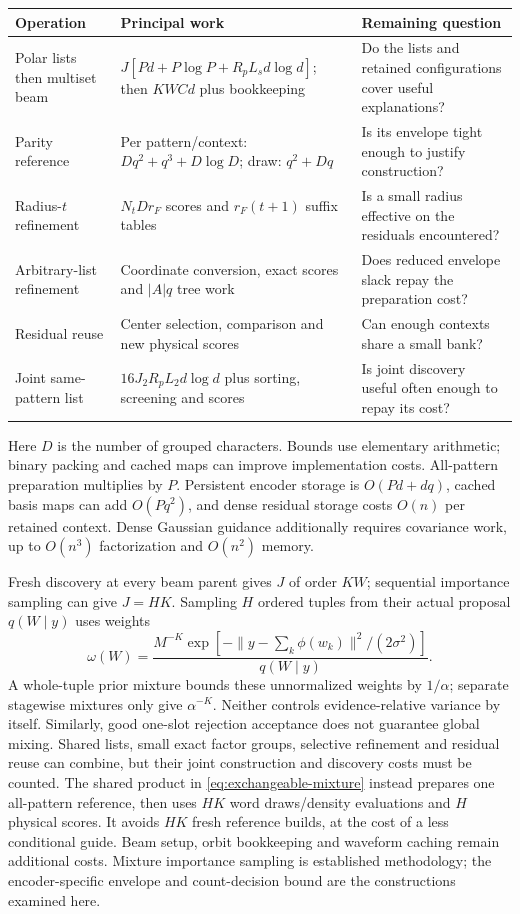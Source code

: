 \documentclass[10pt,a4paper]{article}
\begin{document}
\begin{center}\small
\begin{tabularx}{\textwidth}{@{}>{\raggedright\arraybackslash}p{}YY@{}}\toprule
Operation & Principal work & Remaining question\\\midrule
Polar lists then multiset beam & $J[Pd+P\log P+R_pL_sd\log d]$; then $KWCd$ plus bookkeeping & Do the lists and retained configurations cover useful explanations?\\
Parity reference & Per pattern/context: $Dq^2+q^3+D\log D$; draw: $q^2+Dq$ & Is its envelope tight enough to justify construction?\\
Radius-$t$ refinement & $N_tDr_F$ scores and $r_F(t+1)$ suffix tables & Is a small radius effective on the residuals encountered?\\
Arbitrary-list refinement & Coordinate conversion, exact scores and $|A|q$ tree work & Does reduced envelope slack repay the preparation cost?\\
Residual reuse & Center selection, comparison and new physical scores & Can enough contexts share a small bank?\\
Joint same-pattern list & $16J_2R_pL_2d\log d$ plus sorting, screening and scores & Is joint discovery useful often enough to repay its cost?\\\bottomrule
\end{tabularx}
\end{center}

Here $D$ is the number of grouped characters. Bounds use elementary arithmetic; binary packing and cached
maps can improve implementation costs. All-pattern preparation multiplies by $P$. Persistent encoder storage
is $O(Pd+dq)$, cached basis maps can add $O(Pq^2)$, and dense residual storage costs $O(n)$ per retained context.
Dense Gaussian guidance additionally requires covariance work, up to $O(n^3)$ factorization and $O(n^2)$ memory.

Fresh discovery at every beam parent gives $J$ of order $KW$; sequential importance sampling can give $J=HK$.
Sampling $H$ ordered tuples from their actual proposal $q(W\mid y)$ uses weights
\[
 \omega(W)=\frac{M^{-K}\exp[-\|y-\sum_k\phi(w_k)\|^2/(2\sigma^2)]}{q(W\mid y)}.
\]
A whole-tuple prior mixture bounds these unnormalized weights by $1/\alpha$; separate stagewise mixtures
only give $\alpha^{-K}$. Neither controls evidence-relative variance by itself. Similarly, good one-slot
rejection acceptance does not guarantee global mixing. Shared lists, small exact factor groups, selective
refinement and residual reuse can combine, but their joint construction and discovery costs must be counted.
The shared product in \eqref{eq:exchangeable-mixture} instead prepares one all-pattern reference,
then uses $HK$ word draws/density evaluations and $H$ physical scores. It avoids $HK$ fresh reference
builds, at the cost of a less conditional guide. Beam setup, orbit bookkeeping and waveform caching
remain additional costs. Mixture importance sampling is established methodology\cite{owen}; the
encoder-specific envelope and count-decision bound are the constructions examined here.
\end{document}
